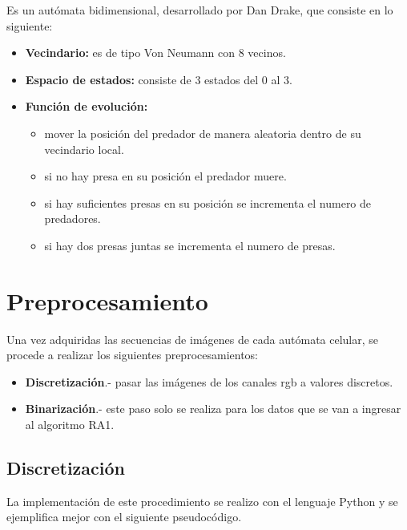 Es un autómata bidimensional, desarrollado por Dan Drake, que consiste en lo siguiente:
\begin{itemize}
	\item \textbf{Vecindario:} es de tipo Von Neumann con 8 vecinos.
	\item \textbf{Espacio de estados:} consiste de 3 estados del 0 al 3.
	\item \textbf{Función de evolución:} 
	\begin{itemize}
		\item mover la posición del predador de manera aleatoria dentro de su vecindario local.
		\item si no hay presa en su posición el predador muere.
		\item si hay suficientes presas en su posición se incrementa el numero de predadores.
		\item si hay dos presas juntas se incrementa el numero de presas.
	\end{itemize}
\end{itemize}

\section{Preprocesamiento}
Una vez adquiridas las secuencias de imágenes de cada autómata celular, se procede a realizar los siguientes preprocesamientos:
\begin{itemize}
	\item \textbf{Discretización}.- pasar las imágenes de los canales rgb a valores discretos.
	\item \textbf{Binarización}.- este paso solo se realiza para los datos que se van a ingresar al algoritmo RA1.
\end{itemize}

\subsection{Discretización}

La implementación de este procedimiento se realizo con el lenguaje Python y se ejemplifica mejor con el siguiente pseudocódigo.

